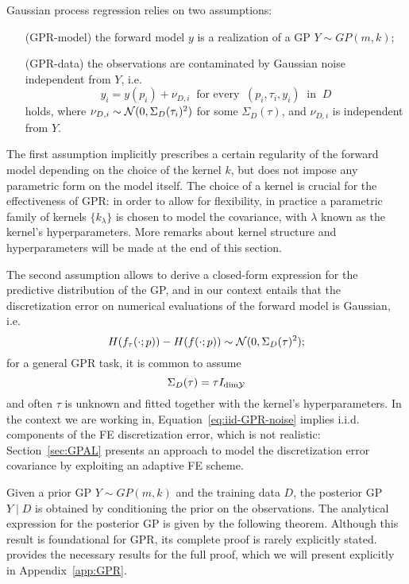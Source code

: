 Gaussian process regression relies on two assumptions:
\begin{itemize}[font=\itshape, leftmargin=1.5cm, align=right, labelwidth=2.4cm]
    \item[(GPR-model)] the forward model $y$ is a realization of a GP $Y \sim GP(m, k)$;
    \item[(GPR-data)] the observations are contaminated by Gaussian noise independent from $Y$, i.e. 
    \[ 
        y_i = y(p_i) + \nu_{D,i} \ \text{ for every } \ (p_i,\tau_i,y_i) \ \text{ in } \ D 
    \] 
    holds, where $\nu_{D,i} \sim \mathcal N(0, \Sigma_D(\tau_i)^2)$ for some $\Sigma_D(\tau)$, and $\nu_{D,i}$ is independent from $Y$.
\end{itemize}  
The first assumption implicitly prescribes a certain regularity of the forward model depending on the choice of the kernel $k$, but does not impose any parametric form on the model itself. 
The choice of a kernel is crucial for the effectiveness of GPR: in order to allow for flexibility, in practice a parametric family of kernels $\{ k_\lambda\}$ is chosen to model the covariance, with $\lambda$ known as the kernel's hyperparameters. More remarks about kernel structure and hyperparameters will be made at the end of this section.

The second assumption allows to derive a closed-form expression for the predictive distribution of the GP, and in our context entails that the discretization error on numerical evaluations of the forward model is Gaussian, i.e. 
\[
    H(f_{\tau}(\cdot; p)) - H(f(\cdot; p)) \sim \mathcal N(0, \Sigma_D(\tau)^2);
\] for a general GPR task, it is common to assume 
\begin{equation}\label{eq:iid-GPR-noise}
    \Sigma_D(\tau) = \tau I_{\text{dim} \mathcal Y}
\end{equation} 
and often $\tau$ is unknown and fitted together with the kernel's hyperparameters. \newline
In the context we are working in, Equation~\eqref{eq:iid-GPR-noise} implies i.i.d. components of the FE discretization error, which is not realistic: Section~\ref{sec:GPAL} presents an approach to model the discretization error covariance by exploiting an adaptive FE scheme. \medbreak

Given a prior GP $Y \sim GP(m, k)$ and the training data $D$, the posterior GP $Y \mid D$ is obtained by conditioning the prior on the observations. 
The analytical expression for the posterior GP is given by the following theorem.
Although this result is foundational for GPR, its complete proof is rarely explicitly stated.~\cite[Appendix A]{RasmussenWilliams2006} provides the necessary results for the full proof, which we will present explicitly in Appendix~\ref{app:GPR}.

